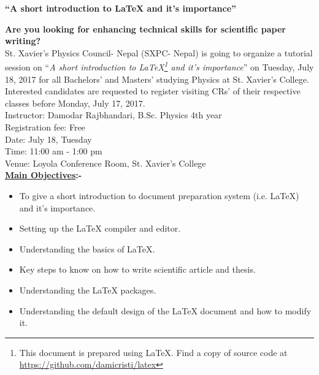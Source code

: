 \documentclass[a4paper,10pt]{article} %
\begin{document}
\vspace*{2.1cm} %

\begin{center} %
\bfseries \LARGE \textquotedblleft A short introduction to \LaTeX \hspace{0.01cm} and it's importance\textquotedblright
\end{center}

\vspace{0.1cm} %

\textbf{Are you looking for enhancing technical skills for scientific paper writing?}\\ %

St. Xavier's Physics Council- Nepal (SXPC- Nepal) is going to organize a tutorial session on  \textquotedblleft \textit{A short introduction to \LaTeX\footnote{This document is prepared using \LaTeX. Find a copy of source code at \url{https://github.com/damicristi/latex}} and it's importance}\textquotedblright \hspace{0.01cm} on Tuesday, July 18, 2017 for all Bachelors' and Masters' studying Physics at St. Xavier's College. Interested candidates are requested to register visiting CRs' of their respective classes before Monday, July 17, 2017. \\

Instructor: Damodar Rajbhandari, B.Sc. Physics 4th year\\
\hspace*{0.43cm} Registration fee: Free\\ %
\hspace*{0.43cm} Date: July 18, Tuesday\\
\hspace*{0.43cm}  Time: 11:00 am - 1:00 pm\\
\hspace*{0.43cm} Venue: Loyola Conference Room, St. Xavier's College\\


\textbf{\underline{Main Objectives}:-}
\begin{itemize} %
\item To give a short introduction to document preparation system (i.e. \LaTeX) and it's importance.
\item Setting up the \LaTeX \hspace{0.01cm} compiler and editor.
\item Understanding the basics of \LaTeX.
\item Key steps to know on how to write scientific article and thesis.
\item Understanding the \LaTeX \hspace{0.01cm} packages.
\item Understanding the default design of the \LaTeX \hspace{0.01cm} document and how to modify it.  
\end{itemize}
\end{document}
